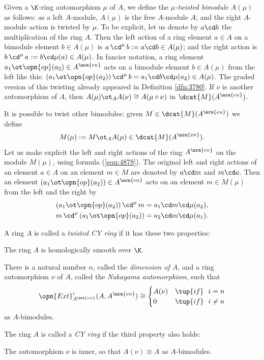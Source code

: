 Given a $\K$-ring automorphism $\mu$ of $A$, we define the
{\em $\mu$-twisted bimodule} $A(\mu)$ as follows: as a left $A$-module,
$A(\mu)$ is the free $A$-module $A$; and the right $A$-module action is 
twisted by $\mu$. To be explicit, let us denote by $a \cd b$ the 
multiplication of the ring $A$. Then the left action of a ring element 
$a \in A$ on a bimodule element $b \in A(\mu)$ is 
$a \, \cd^{\mu} \, b := a \cd b \in A(\mu)$; and the right action is 
$b \, \cd^{\mu} \, a := b \cd \mu(a) \in A(\mu)$.
In fancier notation,  a ring element 
$a_1 \ot \opn{op}(a_2) \in A^{\mrm{en}}$
acts on a bimodule element $b \in A(\mu)$ from the left like this:
$(a_1 \ot \opn{op}(a_2)) \, \cd^{\mu} \, b = a_1 \cd b \cd \mu(a_2) 
\in A(\mu)$.
The graded version of this twisting already appeared in Definition 
\ref{dfn:3780}. 
If $\nu$ is another automorphism of $A$, then 
$A(\mu) \ot_A A(\nu) \cong A(\mu \circ \nu)$
in $\dcat{M}(A^{\mrm{en}})$. 

It is possible to twist other bimodules: 
given $M \in \dcat{M}(A^{\mrm{en}})$ we define 
\begin{equation} \label{eqn:4896}
M(\mu) := M \ot_A A(\mu) \in \dcat{M}(A^{\mrm{en}}) . 
\end{equation}
Let us make explicit the left and right actions of the 
ring $A^{\mrm{en}}$ on the module $M(\mu)$, using formula (\ref{eqn:4878}). 
The original left and right actions of an element $a \in A$ on an element
$m \in M$ are denoted by $a \cd m$ and $m \cd a$. Then an element 
$(a_1 \ot \opn{op}(a_2)) \in A^{\mrm{en}}$ acts on an element 
$m \in M(\mu)$ from the left and the right  by 
\begin{equation} \label{eqn:4904}
\begin{aligned}
& 
(a_1 \ot \opn{op}(a_2)) \, \cd^{\mu} \, m = 
a_1 \cd m \cd \mu(a_2) ,
\\
&
m \, \cd^{\mu} \, (a_1 \ot \opn{op}(a_2)) = 
a_2 \cd m \cd \mu(a_1) . 
\end{aligned}
\end{equation}

\begin{dfn} \label{dfn:4490}
A ring $A$ is called a {\em twisted CY ring} if it has these 
two properties:
\begin{itemize}
 The ring $A$ is homologically smooth over $\K$. 
 
 There is a natural number $n$, called the {\em dimension of $A$}, 
and a ring automorphism $\nu$ of $A$, called the {\em Nakayama automorphism}, 
such that 
\[ \opn{Ext}^i_{A^{\mrm{en}}}(A, A^{\mrm{en}}) \cong
\begin{cases}
A(\nu) & \tup{if} \ \ i = n 
\\
0 & \tup{if} \ \ i \neq n 
\end{cases} 
\]
as $A$-bimodules. 
\end{itemize}
The ring $A$ is called a {\em CY ring} if the third property also holds:
\begin{itemize}
 The automorphism $\nu$ is inner, so that $A(\nu) \cong A$ as 
$A$-bimodules.
\end{itemize}
\end{dfn}

